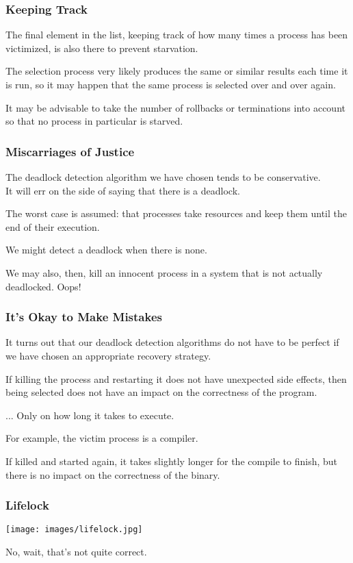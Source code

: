 \begin{frame}
	\frametitle{Keeping Track}

	The final element in the list, keeping track of how many times a process has been victimized, is also there to prevent starvation.

	The selection process very likely produces the same or similar results each time it is run, so it may happen that the same process is selected over and over again.

	It may be advisable to take the number of rollbacks or terminations into account so that no process in particular is starved.

\end{frame}

\begin{frame}
	\frametitle{Miscarriages of Justice}

	The deadlock detection algorithm we have chosen tends to be conservative.\\
	\quad It will err on the side of saying that there is a deadlock.

	The worst case is assumed: that processes take resources and keep them until the end of their execution.

	We might detect a deadlock when there is none.

	We may also, then, kill an innocent process in a system that is not actually deadlocked. Oops!

\end{frame}

\begin{frame}
	\frametitle{It's Okay to Make Mistakes}

	It turns out that our deadlock detection algorithms do not have to be perfect if we have chosen an appropriate recovery strategy.

	If killing the process and restarting it does not have unexpected side effects, then being selected does not have an impact on the correctness of the program.

	... Only on how long it takes to execute.

	For example, the victim process is a compiler.

	If killed and started again, it takes slightly longer for the compile to finish, but there is no impact on the correctness of the binary.

\end{frame}


\begin{frame}
\frametitle{Lifelock}

\begin{center}
	\texttt{[image: images/lifelock.jpg]}
\end{center}

No, wait, that's not quite correct.

\end{frame}


